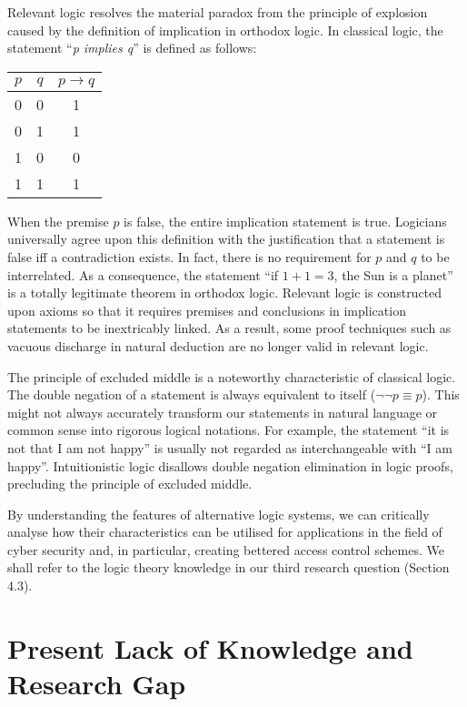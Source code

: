 \documentclass{article}
\begin{document}
Relevant logic resolves the material paradox from the principle of explosion
caused by the definition of implication in orthodox logic. In classical logic,
the statement ``\textit{p implies q}'' is defined as follows: \begin{center}
\begin{tabular}{cc|c}
    $p$ & $q$ & $p \to q$\\ \hline 0 & 0 & 1\\ 0 & 1 & 1\\ 1 & 0 & 0\\ 1 &
    1 & 1
\end{tabular} \end{center} When the premise $p$ is false, the
entire implication statement is true. Logicians universally agree upon
this definition with the justification that a statement is false iff a
contradiction exists. In fact, there is no requirement for $p$ and $q$ to be
interrelated. As a consequence, the statement ``if $1 + 1 = 3$, the Sun is a
planet'' is a totally legitimate theorem in orthodox logic. Relevant logic
is constructed upon axioms so that it requires premises and conclusions in
implication statements to be inextricably linked. As a result, some proof
techniques such as vacuous discharge in natural deduction are no longer
valid in relevant logic.\cite{relevant-logic}

The principle of excluded middle is a noteworthy characteristic of classical
logic. The double negation of a statement is always equivalent to itself
($\neg \neg p \equiv p$). This might not always accurately transform
our statements in natural language or common sense into rigorous logical
notations. For example, the statement ``it is not that I am not happy'' is
usually not regarded as interchangeable with ``I am happy''. Intuitionistic
logic disallows double negation elimination in logic proofs, precluding the
principle of excluded middle.\cite{alternative-logic}

By understanding the features of alternative logic systems, we can critically
analyse how their characteristics can be utilised for applications in the
field of cyber security and, in particular, creating bettered access control
schemes. We shall refer to the logic theory knowledge in our third research
question (Section 4.3).

\section{Present Lack of Knowledge and Research Gap}
\end{document}
